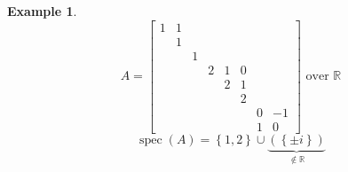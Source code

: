 \documentclass[a4paper]{article}
\newcounter{lecref}[section]
\numberwithin{lecref}{section}
\newtheorem{example}[lecref]{Example}
\newcommand{\set}[1]{\left\{#1\right\}}
\begin{document}
\begin{example} %
  \[
    A = \begin{bmatrix}
      1 & 1 &   &   &   &   &   & \\
        & 1 &   &   &   &   &   & \\
        &   & 1 &   &   &   &   & \\
        &   &   & 2 & 1 & 0 &   & \\
        &   &   &   & 2 & 1 &   & \\
        &   &   &   &   & 2 &   & \\
        &   &   &   &   &   & 0 & -1 \\
        &   &   &   &   &   & 1 & 0
    \end{bmatrix}
    \text{ over $\mathbb R$}
  \]
  \[ \operatorname{spec}(A) = \set{1,2} \cup \underbrace{(\set{\pm i})}_{\not\in \mathbb R} \]


\end{example}
\end{document}

